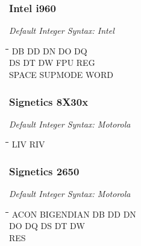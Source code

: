\subsubsection{Intel i960}

{\em Default Integer Syntax: Intel}

{\tt\begin{tabbing}
\hspace{3cm}\=\hspace{3cm}\=\hspace{3cm}\=\hspace{3cm}\=\kill    
DB         \> DD          \> DN          \> DO          \> DQ \\
DS         \> DT          \> DW          \> FPU         \> REG \\
SPACE      \> SUPMODE     \> WORD \\
\end{tabbing}}

\subsubsection{Signetics 8X30x}

{\em Default Integer Syntax: Motorola}

{\tt\begin{tabbing}
\hspace{3cm}\=\hspace{3cm}\=\hspace{3cm}\=\hspace{3cm}\=\kill
LIV        \> RIV         \\   
\end{tabbing}}

\subsubsection{Signetics 2650}

{\em Default Integer Syntax: Motorola}

{\tt\begin{tabbing}
\hspace{3cm}\=\hspace{3cm}\=\hspace{3cm}\=\hspace{3cm}\=\kill
ACON       \> BIGENDIAN  \> DB          \> DD          \> DN \\
DO         \> DQ         \> DS          \> DT          \> DW \\
RES \\
\end{tabbing}}

